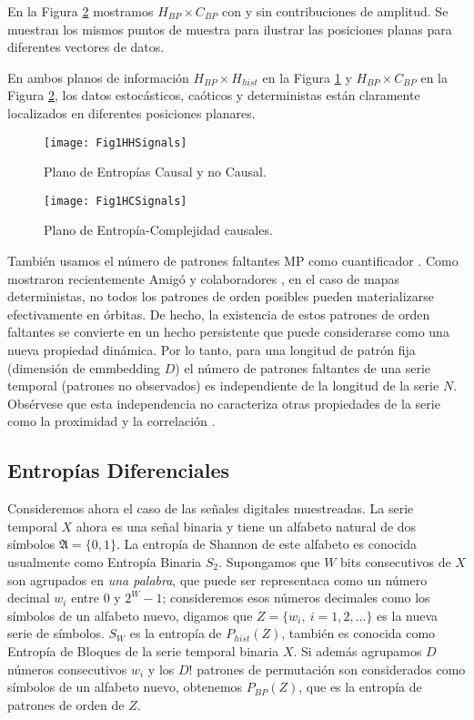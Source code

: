 En la Figura \ref{fig:HC} mostramos $H_{BP} \times C_{BP}$ con y sin contribuciones de amplitud.
Se muestran los mismos puntos de muestra para ilustrar las posiciones planas para diferentes vectores de datos.

En ambos planos de información $H_ {BP} \times H_ {hist}$ en la Figura \ref{fig:HH} y $H_{BP} \times C_{BP}$ en la Figura \ref{fig:HC}, los datos estocásticos, caóticos y deterministas están claramente localizados en diferentes posiciones planares.

\begin{figure}[htpb]
	\centering	
	\texttt{[image: Fig1HHSignals]}
	\caption{Plano de Entropías Causal y no Causal.}
	\label{fig:HH}
\end{figure}

\begin{figure}[htpb]
	\centering		
	\texttt{[image: Fig1HCSignals]}
	\caption{Plano de Entropía-Complejidad causales.}
	\label{fig:HC}
\end{figure}

También usamos el número de patrones faltantes MP como cuantificador \cite{Rosso2012}.
Como mostraron recientemente Amigó y colaboradores \cite{Amigo2006,Amigo2007,Amigo2008,Amigo2010}, en el caso de mapas deterministas, no todos los patrones de orden posibles pueden materializarse efectivamente en órbitas.
De hecho, la existencia de estos patrones de orden faltantes se convierte en un hecho persistente que puede considerarse como una nueva propiedad dinámica.
Por lo tanto, para una longitud de patrón fija (dimensión de emmbedding $D$) el número de patrones faltantes de una serie temporal (patrones no observados) es independiente de la longitud de la serie $N$.
Obsérvese que esta independencia no caracteriza otras propiedades de la serie como la proximidad y la correlación \cite{Amigo2007,Amigo2010}.

\subsection{Entropías Diferenciales}

Consideremos ahora el caso de las señales digitales muestreadas.
La serie temporal $X$ ahora es una señal binaria y tiene un alfabeto natural de dos símbolos $\mathfrak{A}=\{0,1\}$.
La entropía de Shannon de este alfabeto es conocida usualmente como Entropía Binaria $S_2$.
Supongamos que $W$ bits consecutivos de $X$ son agrupados en \textit{una palabra}, que puede ser representaca como un número decimal $w_i$ entre $0$ y $2^W-1$; consideremos esos números decimales como los símbolos de un alfabeto nuevo, digamos que $Z=\{w_i,~i=1,2,...\}$ es la nueva serie de símbolos.
$S_W$ es la entropía de $P_{hist}(Z)$, también es conocida como Entropía de Bloques de la serie temporal binaria $X$.
Si además agrupamos $D$ números consecutivos $w_i$ y los $D!$ patrones de permutación son considerados como símbolos de un alfabeto nuevo, obtenemos $P_{BP}(Z)$, que es la entropía de patrones de orden de $Z$.


